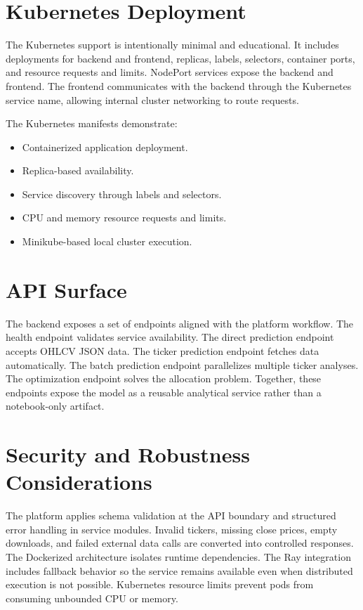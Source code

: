 \documentclass[conference]{IEEEtran}
\begin{document}
\section{Kubernetes Deployment}
The Kubernetes support is intentionally minimal and educational. It includes deployments for backend and frontend, replicas, labels, selectors, container ports, and resource requests and limits. NodePort services expose the backend and frontend. The frontend communicates with the backend through the Kubernetes service name, allowing internal cluster networking to route requests.

The Kubernetes manifests demonstrate:
\begin{itemize}
    \item Containerized application deployment.
    \item Replica-based availability.
    \item Service discovery through labels and selectors.
    \item CPU and memory resource requests and limits.
    \item Minikube-based local cluster execution.
\end{itemize}

\section{API Surface}
The backend exposes a set of endpoints aligned with the platform workflow. The health endpoint validates service availability. The direct prediction endpoint accepts OHLCV JSON data. The ticker prediction endpoint fetches data automatically. The batch prediction endpoint parallelizes multiple ticker analyses. The optimization endpoint solves the allocation problem. Together, these endpoints expose the model as a reusable analytical service rather than a notebook-only artifact.

\section{Security and Robustness Considerations}
The platform applies schema validation at the API boundary and structured error handling in service modules. Invalid tickers, missing close prices, empty downloads, and failed external data calls are converted into controlled responses. The Dockerized architecture isolates runtime dependencies. The Ray integration includes fallback behavior so the service remains available even when distributed execution is not possible. Kubernetes resource limits prevent pods from consuming unbounded CPU or memory.
\end{document}
